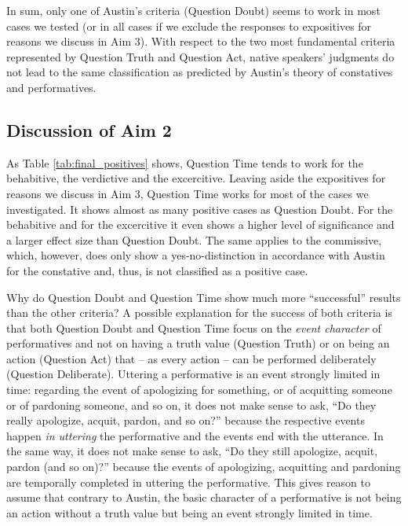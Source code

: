 \documentclass[egregdoesnotlikesansseriftitles,12pt]{scrartcl}
\begin{document}
In sum, only one of Austin's criteria (Question Doubt) seems to work in most cases we tested (or in all cases if we exclude the responses to expositives for reasons we discuss in Aim 3). With respect to the two most fundamental criteria represented by Question Truth and Question Act, native speakers' judgments do not lead to the same classification as predicted by Austin's theory of constatives and performatives.


\subsection{Discussion of Aim 2}
As Table \ref{tab:final_positives} shows, Question Time tends to work for the behabitive, the verdictive and the excercitive. Leaving aside the expositives for reasons we discuss in Aim 3, Question Time works for most of the cases we investigated. It shows almost as many positive cases as Question Doubt. For the behabitive and for the excercitive it even shows a higher level of significance and a larger effect size than Question Doubt. The same applies to the commissive, which, however, does only show a yes-no-distinction in accordance with Austin for the constative and, thus, is not classified as a positive case.

Why do Question Doubt and Question Time show much more ``successful'' results than the other criteria? A possible explanation for the success of both criteria is that both Question Doubt and Question Time focus on the \textit{event character} of performatives and not on having a truth value (Question Truth) or on being an action (Question Act) that -- as every action -- can be performed deliberately (Question Deliberate). Uttering a performative is an event strongly limited in time: regarding the event of apologizing for something, or of acquitting someone or of pardoning someone, and so on, it does not make sense to ask, ``Do they really apologize, acquit, pardon, and so on?'' because the respective events happen \textit{in uttering} the performative and the events end with the utterance. In the same way, it does not make sense to ask, ``Do they still apologize, acquit, pardon (and so on)?'' because the events of apologizing, acquitting and pardoning are temporally completed in uttering the performative. This gives reason to assume that contrary to Austin, the basic character of a performative is not being an action without a truth value but being an event strongly limited in time.
\end{document}

